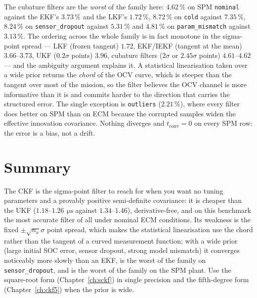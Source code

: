 The cubature filters are the \emph{worst} of the family here: $4.62\,\%$ on SPM
\texttt{nominal} against the EKF's $3.73\,\%$ and the LKF's $1.72\,\%$, $8.72\,\%$ on
\texttt{cold} against $7.35\,\%$, $8.24\,\%$ on \texttt{sensor\_dropout} against $5.31\,\%$ and
$4.81\,\%$ on \texttt{param\_mismatch} against $3.13\,\%$. The ordering across the whole family
is in fact monotone in the sigma-point spread --- LKF (frozen tangent) $1.72$, EKF/IEKF
(tangent at the mean) $3.66$--$3.73$, UKF ($0.2\sigma$ points) $3.96$, cubature filters
($2\sigma$ or $2.45\sigma$ points) $4.61$--$4.62$ --- and the ambiguity argument explains it.
A statistical linearisation taken over a wide prior returns the \emph{chord} of the OCV curve,
which is steeper than the tangent over most of the mission, so the filter believes the OCV
channel is more informative than it is and commits harder to the direction that carries the
structured error. The single exception is \texttt{outliers} ($2.21\,\%$), where every filter
does better on SPM than on ECM because the corrupted samples widen the effective innovation
covariance. Nothing diverges and $t_{\text{conv}} = 0$ on every SPM row: the error is a bias,
not a drift.

\section{Summary}
The CKF is the sigma-point filter to reach for when you want no tuning parameters and a
provably positive semi-definite covariance: it is cheaper than the UKF
($1.18$--$1.26\,\SI{}{\micro\second}$ against $1.34$--$1.46$), derivative-free, and on this
benchmark the most accurate filter of all under nominal ECM conditions. Its weakness is the
fixed $\pm\sqrt{n_x}\sigma$ point spread, which makes the statistical linearisation use the
chord rather than the tangent of a curved measurement function; with a wide prior (large
initial SOC error, sensor dropout, strong model mismatch) it converges noticeably more slowly
than an EKF, is the worst of the family on \texttt{sensor\_dropout}, and is the worst of the
family on the SPM plant. Use the square-root form (Chapter~\ref{ch:sckf}) in single precision
and the fifth-degree form (Chapter~\ref{ch:ckf5}) when the prior is wide.
